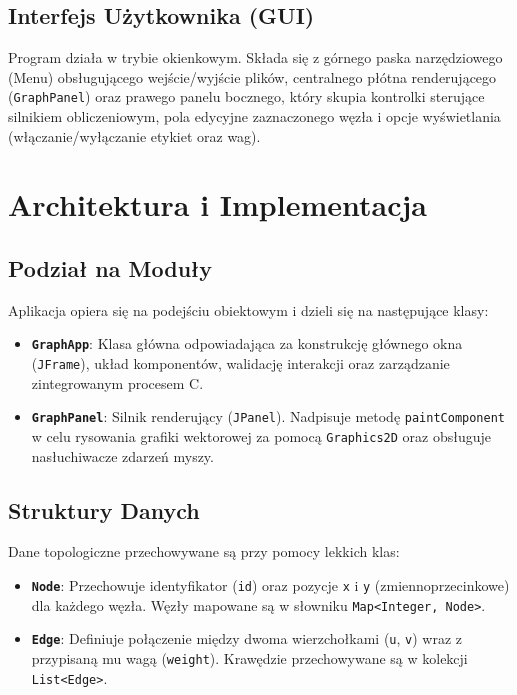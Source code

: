 \documentclass[12pt, a4paper]{article}
\begin{document}
\subsection{Interfejs Użytkownika (GUI)}
Program działa w trybie okienkowym. Składa się z górnego paska narzędziowego (Menu) obsługującego wejście/wyjście plików, centralnego płótna renderującego (\texttt{GraphPanel}) oraz prawego panelu bocznego, który skupia kontrolki sterujące silnikiem obliczeniowym, pola edycyjne zaznaczonego węzła i opcje wyświetlania (włączanie/wyłączanie etykiet oraz wag).

\section{Architektura i Implementacja}

\subsection{Podział na Moduły}
Aplikacja opiera się na podejściu obiektowym i dzieli się na następujące klasy:
\begin{itemize}
    \item \textbf{\texttt{GraphApp}}: Klasa główna odpowiadająca za konstrukcję głównego okna (\texttt{JFrame}), układ komponentów, walidację interakcji oraz zarządzanie zintegrowanym procesem C.
    \item \textbf{\texttt{GraphPanel}}: Silnik renderujący (\texttt{JPanel}). Nadpisuje metodę \texttt{paintComponent} w celu rysowania grafiki wektorowej za pomocą \texttt{Graphics2D} oraz obsługuje nasłuchiwacze zdarzeń myszy.
\end{itemize}

\subsection{Struktury Danych}
Dane topologiczne przechowywane są przy pomocy lekkich klas:
\begin{itemize}
    \item \textbf{\texttt{Node}}: Przechowuje identyfikator (\texttt{id}) oraz pozycje \texttt{x} i \texttt{y} (zmiennoprzecinkowe) dla każdego węzła. Węzły mapowane są w słowniku \texttt{Map<Integer, Node>}.
    \item \textbf{\texttt{Edge}}: Definiuje połączenie między dwoma wierzchołkami (\texttt{u}, \texttt{v}) wraz z przypisaną mu wagą (\texttt{weight}). Krawędzie przechowywane są w kolekcji \texttt{List<Edge>}.
\end{itemize}
\end{document}
